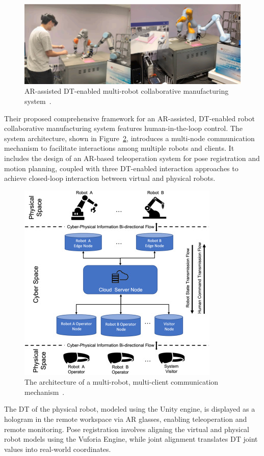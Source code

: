 \begin{figure}[!htpb]
    \centering
    \includegraphics[width=0.85\linewidth]{figs/physical-digital.png}
    \caption{\ac{AR}-assisted \ac{DT}-enabled multi-robot collaborative manufacturing system~\cite{LI2022102321}.}
    \label{fig:physical-digital}
\end{figure}

Their proposed comprehensive framework for an \ac{AR}-assisted, \ac{DT}-enabled robot collaborative manufacturing system features human-in-the-loop control. The system architecture, shown in Figure~\ref{f:system-framework}, introduces a multi-node communication mechanism to facilitate interactions among multiple robots and clients. It includes the design of an \ac{AR}-based teleoperation system for pose registration and motion planning, coupled with three \ac{DT}-enabled interaction approaches to achieve closed-loop interaction between virtual and physical robots.

\begin{figure}[!htpb]
    \centering
    \includegraphics[width=0.5\linewidth]{figs/framework.jpg}
    \caption{The architecture of a multi-robot, multi-client communication mechanism~\cite{LI2022102321}.}
    \label{f:system-framework}
\end{figure}

The \ac{DT} of the physical robot, modeled using the Unity engine, is displayed as a hologram in the remote workspace via \ac{AR} glasses, enabling teleoperation and remote monitoring. Pose registration involves aligning the virtual and physical robot models using the Vuforia Engine, while joint alignment translates \ac{DT} joint values into real-world coordinates.

